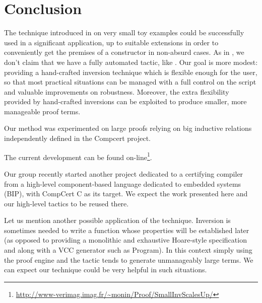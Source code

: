 \section{Conclusion}
\label{sec:conclusion}

The technique introduced in \cite{small_inv}
on very small toy examples
could be successfully used in a significant application,
up to suitable extensions in order to conveniently get
the premises of a constructor in non-absurd cases.
As in \cite{small_inv},
we don't claim that we have a fully automated tactic,
like \inversion.
Our goal is more modest:
providing a hand-crafted inversion technique 
which is flexible enough for the user,
so that most practical situations can be managed
with a full control on the script and valuable
improvements on robustness.
Moreover, the extra flexibility provided by hand-crafted inversions can
be exploited to produce smaller, more manageable proof terms.

Our method was experimented on large proofs relying on 
big inductive relations independently defined in the Compcert project.

The current development can be found on-line\footnote{%
\label{f:site}
\url{http://www-verimag.imag.fr/~monin/Proof/SmallInvScalesUp/}
}.

Our group recently started another project dedicated
to a certifying compiler from a high-level component-based language dedicated
to embedded systems (BIP), with CompCert C as its target. 
We expect the work presented here and our high-level tactics
to be reused there.

Let us mention another possible application of the technique.
Inversion is sometimes
needed to write a function whose properties will be established later (as
opposed to providing a monolithic and exhaustive Hoare-style specification and
along with a VCC generator such as Program). 
In this context simply using the proof engine and the \inversion tactic
tends to generate unmanageably large terms.
We can expect our technique could be very helpful in such situations.





